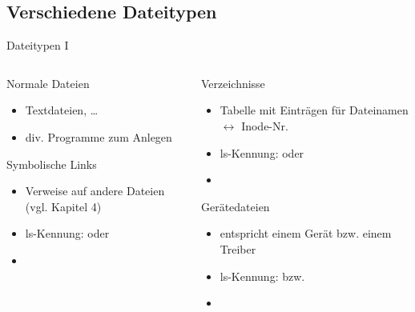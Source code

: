 \documentclass[aspectratio=43]{beamer}
\begin{document}
\subsection{Verschiedene Dateitypen}
\begin{frame}{Dateitypen I}
  \begin{columns}
    \begin{column}{0.5\textwidth}
      \begin{block}{Normale Dateien}
        \begin{itemize}
          \item Textdateien, \dots
          \item div. Programme zum Anlegen
        \end{itemize}
      \end{block}
      \begin{block}{Symbolische Links}
        \begin{itemize}
	  \item  Verweise auf andere Dateien (vgl. Kapitel 4)
	  \item ls-Kennung:  oder 
          \item  {}
        \end{itemize}
      \end{block}
    \end{column}
    \begin{column}{0.5\textwidth}
       \begin{block}{Verzeichnisse}
            \begin{itemize}
	      \item  Tabelle mit Einträgen für Dateinamen $\leftrightarrow$ Inode-Nr.
	      \item ls-Kennung:  oder \co{/}
              \item  {}
            \end{itemize}
        \end{block}
       \begin{block}{Gerätedateien}
            \begin{itemize}
	      \item entspricht einem Gerät bzw. einem Treiber
	      \item ls-Kennung:  bzw. 
              \item {}
            \end{itemize}
        \end{block}
    \end{column}
  \end{columns}
\end{frame}
\end{document}
